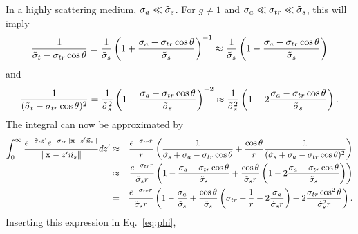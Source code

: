 \documentclass[10pt,a4paper]{article}
\begin{document}
In a highly scattering medium, $\sigma_a \ll \tilde{\sigma}_s$. For $g \ne 1$ and $\sigma_a \ll \sigma_{tr} \ll \tilde{\sigma}_s$, this will imply
\begin{equation*}
    \frac{1}{\tilde{\sigma}_t - \sigma_{tr} \cos \theta} =
    \frac{1}{\tilde{\sigma}_s} \left(1 +
    \frac{\sigma_a - \sigma_{tr} \cos \theta}{\tilde{\sigma}_s}  \right)^{-1} \approx
    \frac{1}{\tilde{\sigma}_s}  \left(1 -
    \frac{\sigma_a - \sigma_{tr} \cos \theta}{\tilde{\sigma}_s}  \right)
\end{equation*}
and
\begin{equation*}
    \frac{1}{(\tilde{\sigma}_t - \sigma_{tr} \cos \theta)^2} =
    \frac{1}{\tilde{\sigma}_s^2} \left(1 + \frac{\sigma_a - \sigma_{tr} \cos \theta}{\tilde{\sigma}_s}  \right)^{-2} \approx
    \frac{1}{\tilde{\sigma}_s^2}  \left(1 - 2 \frac{\sigma_a - \sigma_{tr} \cos \theta}{\tilde{\sigma}_s}  \right).
\end{equation*}
The integral can now be approximated by
\begin{eqnarray*}
     \int_0^\infty  \frac{e^{-\tilde{\sigma}_t z'} e^{-\sigma_{tr}\|\mathbf{x}
    - z' \vec{n}_s\| }}{\|\mathbf{x} - z' \vec{n}_s\|} dz' & \approx &
   \frac{e^{-\sigma_{tr} r}}{r} \left( \frac{1}{\tilde{\sigma}_s + \sigma_a - \sigma_{tr}
    \cos \theta } + \frac{\cos \theta}{r} \frac{1}{(\tilde{\sigma}_s + \sigma_a - \sigma_{tr} \cos \theta)^2}
    \right) \\
    &\approx & \frac{e^{-\sigma_{tr} r}}{\tilde{\sigma}_s r} \left(1 -
    \frac{\sigma_a - \sigma_{tr} \cos \theta}{\tilde{\sigma}_s}      +  \frac{\cos \theta}{\tilde{\sigma}_s r} \left(1 - 2 \frac{\sigma_a - \sigma_{tr} \cos \theta}{\tilde{\sigma}_s}  \right)
    \right) \\
    &=&\frac{e^{-\sigma_{tr} r}}{\tilde{\sigma}_s r} \left(1 -
    \frac{\sigma_a}{\tilde{\sigma}_s} + \frac{\cos \theta}{\tilde{\sigma}_s} \left(
    \sigma_{tr} + \frac{1}{r} - 2 \frac{\sigma_a}{\tilde{\sigma}_s r} \right) + 2
    \frac{\sigma_{tr} \cos^2\theta}{\tilde{\sigma}_s^2 r} \right).
\end{eqnarray*}
Inserting this expression in Eq.~\ref{eq:phi},
\end{document}
